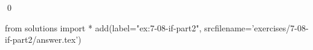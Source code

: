 
\begin{ex}
  \label{ex:7-08-if-part2}
  
  \qed
\end{ex}
\begin{python0}
from solutions import *
add(label="ex:7-08-if-part2",
    srcfilename='exercises/7-08-if-part2/answer.tex')
\end{python0}
